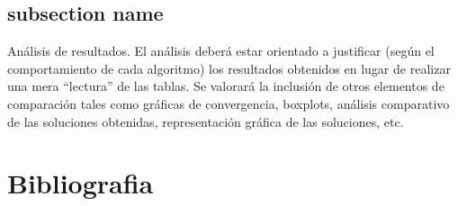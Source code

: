 \begin{table}[]
\centering
{}
\end{table}

\subsection{subsection name}
Análisis de resultados. El análisis deberá estar orientado a justificar
(según el comportamiento de cada algoritmo) los resultados obtenidos en
lugar de realizar una mera “lectura” de las tablas. Se valorará la inclusión
de otros elementos de comparación tales como gráficas de convergencia,
boxplots, análisis comparativo de las soluciones obtenidas, representación
gráfica de las soluciones, etc.

\section{Bibliografia}

